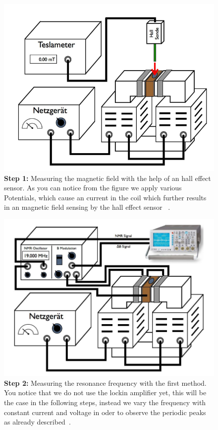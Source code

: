 \begin{figure}[htpb]
    \centering
    \includegraphics[width=0.8\linewidth]{figures/setup1}
    \caption{\textbf{Step 1:} Measuring the magnetic field with the help of 
       an hall effect sensor. As you can notice from the figure we 
      apply various Potentials, which cause an current in the coil which
      further results in an magnetic field sensing by the hall effect sensor
      ~\cite{versuchsanleitung}.}
    \label{fig:figures/setup1}
\end{figure}
\begin{figure}[htpb]
    \centering
    \includegraphics[width=0.8\linewidth]{figures/setup2}
    \caption{\textbf{Step 2:} Measuring the resonance frequency with the first
        method. You notice that we do not use the lockin amplifier yet,
        this will be the case in the following steps, instead we vary the
        frequency with constant current and voltage in oder to observe
        the periodic peaks as already described~\cite{versuchsanleitung}. }
    \label{fig:figures/setup1}
\end{figure}
